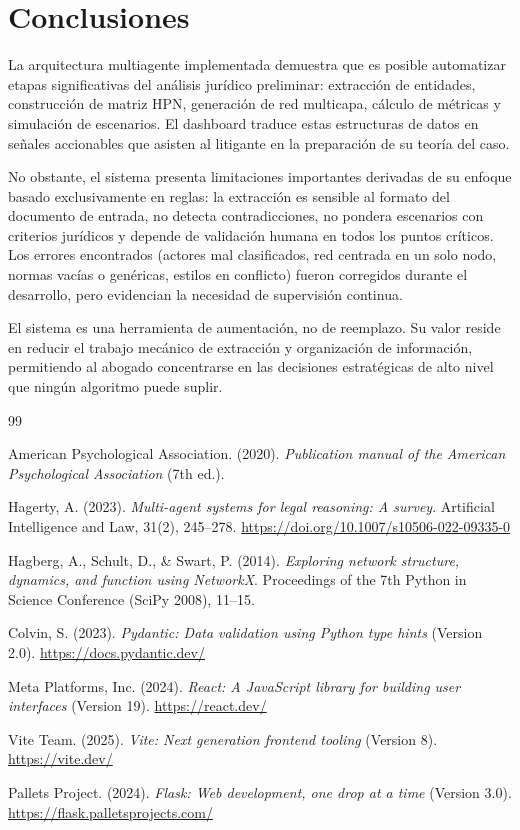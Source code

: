 \documentclass[12pt, letterpaper]{article}
\begin{document}
\section{Conclusiones}

La arquitectura multiagente implementada demuestra que es posible
automatizar etapas significativas del análisis jurídico preliminar:
extracción de entidades, construcción de matriz HPN, generación de
red multicapa, cálculo de métricas y simulación de escenarios. El
dashboard traduce estas estructuras de datos en señales accionables
que asisten al litigante en la preparación de su teoría del caso.

No obstante, el sistema presenta limitaciones importantes derivadas
de su enfoque basado exclusivamente en reglas: la extracción es
sensible al formato del documento de entrada, no detecta
contradicciones, no pondera escenarios con criterios jurídicos y
depende de validación humana en todos los puntos críticos. Los
errores encontrados (actores mal clasificados, red centrada en un
solo nodo, normas vacías o genéricas, estilos en conflicto) fueron
corregidos durante el desarrollo, pero evidencian la necesidad de
supervisión continua.

El sistema es una herramienta de aumentación, no de reemplazo. Su
valor reside en reducir el trabajo mecánico de extracción y
organización de información, permitiendo al abogado concentrarse en
las decisiones estratégicas de alto nivel que ningún algoritmo puede
suplir.

\newpage
\begin{thebibliography}{99}

American Psychological Association. (2020).
\textit{Publication manual of the American Psychological Association}
(7th ed.).

Hagerty, A. (2023). \textit{Multi-agent systems for legal reasoning:
A survey}. Artificial Intelligence and Law, 31(2), 245--278.
\url{https://doi.org/10.1007/s10506-022-09335-0}

Hagberg, A., Schult, D., \& Swart, P. (2014).
\textit{Exploring network structure, dynamics, and function using
NetworkX}. Proceedings of the 7th Python in Science Conference
(SciPy 2008), 11--15.

Colvin, S. (2023). \textit{Pydantic: Data validation using Python
type hints} (Version 2.0). \url{https://docs.pydantic.dev/}

Meta Platforms, Inc. (2024). \textit{React: A JavaScript library for
building user interfaces} (Version 19). \url{https://react.dev/}

Vite Team. (2025). \textit{Vite: Next generation frontend tooling}
(Version 8). \url{https://vite.dev/}

Pallets Project. (2024). \textit{Flask: Web development, one drop at
a time} (Version 3.0). \url{https://flask.palletsprojects.com/}

\end{thebibliography}
\end{document}
